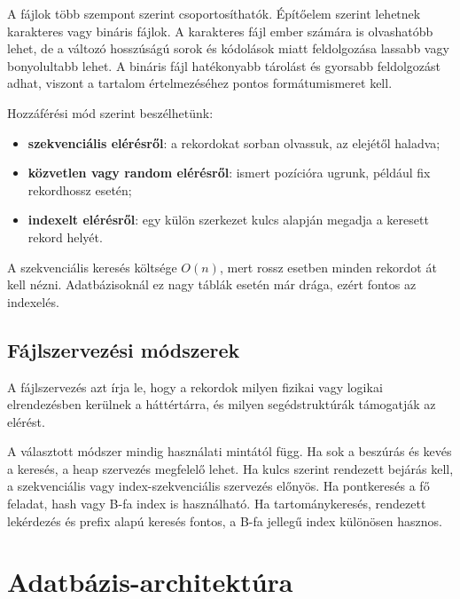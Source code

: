A fájlok több szempont szerint csoportosíthatók. Építőelem szerint lehetnek karakteres vagy bináris fájlok. A karakteres fájl ember számára is olvashatóbb lehet, de a változó hosszúságú sorok és kódolások miatt feldolgozása lassabb vagy bonyolultabb lehet. A bináris fájl hatékonyabb tárolást és gyorsabb feldolgozást adhat, viszont a tartalom értelmezéséhez pontos formátumismeret kell.

Hozzáférési mód szerint beszélhetünk:

\begin{itemize}
  \item \textbf{szekvenciális elérésről}: a rekordokat sorban olvassuk, az elejétől haladva;
  \item \textbf{közvetlen vagy random elérésről}: ismert pozícióra ugrunk, például fix rekordhossz esetén;
  \item \textbf{indexelt elérésről}: egy külön szerkezet kulcs alapján megadja a keresett rekord helyét.
\end{itemize}

A szekvenciális keresés költsége \(O(n)\), mert rossz esetben minden rekordot át kell nézni. Adatbázisoknál ez nagy táblák esetén már drága, ezért fontos az indexelés.

\subsection{Fájlszervezési módszerek}

A fájlszervezés azt írja le, hogy a rekordok milyen fizikai vagy logikai elrendezésben kerülnek a háttértárra, és milyen segédstruktúrák támogatják az elérést.

\begin{center}

\end{center}

A választott módszer mindig használati mintától függ. Ha sok a beszúrás és kevés a keresés, a heap szervezés megfelelő lehet. Ha kulcs szerint rendezett bejárás kell, a szekvenciális vagy index-szekvenciális szervezés előnyös. Ha pontkeresés a fő feladat, hash vagy B-fa index is használható. Ha tartománykeresés, rendezett lekérdezés és prefix alapú keresés fontos, a B-fa jellegű index különösen hasznos.

\section{Adatbázis-architektúra}

